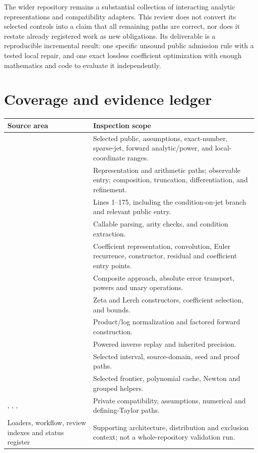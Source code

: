 \documentclass[11pt,letterpaper]{article}
\begin{document}
The wider repository remains a substantial collection of interacting analytic representations and compatibility adapters. This review does not convert its selected controls into a claim that all remaining paths are correct, nor does it restate already registered work as new obligations. Its deliverable is a reproducible incremental result: one specific unsound public admission rule with a tested local repair, and one exact lossless coefficient optimization with enough mathematics and code to evaluate it independently.

\appendix
\section{Coverage and evidence ledger}\label{app:coverage}
\begin{longtable}{@{}P{0.43\textwidth}P{0.50\textwidth}@{}}
\toprule
Source area & Inspection scope\\\midrule\endhead
{} & Selected public, assumptions, exact-number, sparse-jet, forward analytic/power, and local-coordinate ranges.\\
 & Representation and arithmetic paths; observable entry; composition, truncation, differentiation, and refinement.\\
 & Lines 1--175, including the condition-on-jet branch and relevant public entry.\\
 & Callable parsing, arity checks, and condition extraction.\\
 & Coefficient representation, convolution, Euler recurrence, constructor, residual and coefficient entry points.\\
 & Composite approach, absolute error transport, powers and unary operations.\\
 & Zeta and Lerch constructors, coefficient selection, and bounds.\\
 & Product/log normalization and factored forward construction.\\
 & Powered inverse replay and inherited precision.\\
 & Selected interval, source-domain, seed and proof paths.\\
 & Selected frontier, polynomial cache, Newton and grouped helpers.\\
, , ,  & Private compatibility, assumptions, numerical and defining-Taylor paths.\\
Loaders, workflow, review indexes and status register & Supporting architecture, distribution and exclusion context; not a whole-repository validation run.\\
\bottomrule
\end{longtable}
\end{document}
